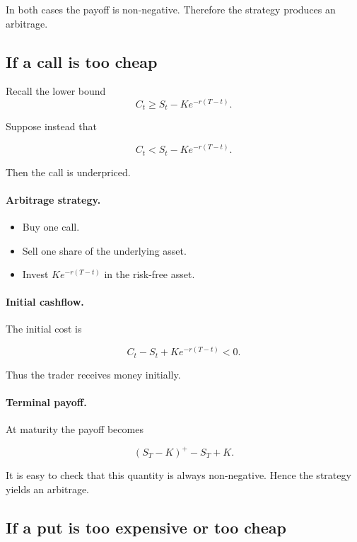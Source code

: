 \documentclass[11pt]{article}
\newcommand{\1}{\mathbf{1}}
\theoremstyle{plain}
\theoremstyle{definition}
\theoremstyle{remark}
\begin{document}
In both cases the payoff is non-negative.
Therefore the strategy produces an arbitrage.

\subsection{If a call is too cheap}

Recall the lower bound
\[
C_t \ge S_t - K e^{-r(T-t)} .
\]

Suppose instead that

\[
C_t < S_t - K e^{-r(T-t)} .
\]

Then the call is underpriced.

\paragraph{Arbitrage strategy.}

\begin{itemize}[leftmargin=1.4em]
\item Buy one call.
\item Sell one share of the underlying asset.
\item Invest \(K e^{-r(T-t)}\) in the risk-free asset.
\end{itemize}

\paragraph{Initial cashflow.}

The initial cost is

\[
C_t - S_t + K e^{-r(T-t)} < 0.
\]

Thus the trader receives money initially.

\paragraph{Terminal payoff.}

At maturity the payoff becomes

\[
(S_T-K)^+ - S_T + K .
\]

It is easy to check that this quantity is always non-negative.
Hence the strategy yields an arbitrage.

\subsection{If a put is too expensive or too cheap}
\end{document}
